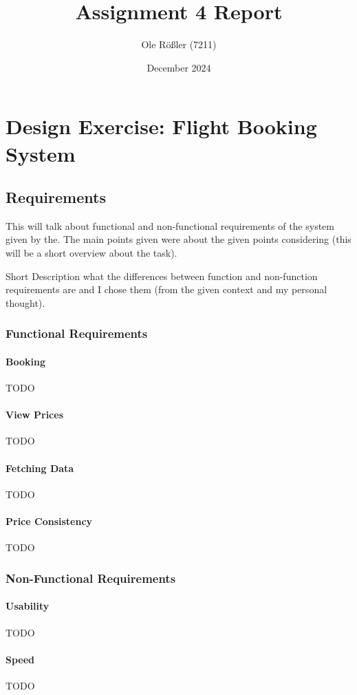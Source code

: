 \documentclass{article}
\title{Assignment 4 Report}
\author{Ole Rößler (7211)}
\date{December 2024}
\begin{document}
\maketitle
\tableofcontents

\newpage
\section{Design Exercise: Flight Booking System}

\subsection{Requirements}
This will talk about functional and non-functional requirements of the system given by the.
The main points given were about the given points considering (this will be a short overview about the task).

Short Description what the differences between function and non-function requirements are and I chose them (from the given context and my personal thought).

\subsubsection{Functional Requirements}
\paragraph{Booking}
TODO
\paragraph{View Prices}
TODO
\paragraph{Fetching Data}
TODO
\paragraph{Price Consistency}
TODO

\subsubsection{Non-Functional Requirements}
\paragraph{Usability}
TODO\paragraph{Speed}
TODO
\end{document}

